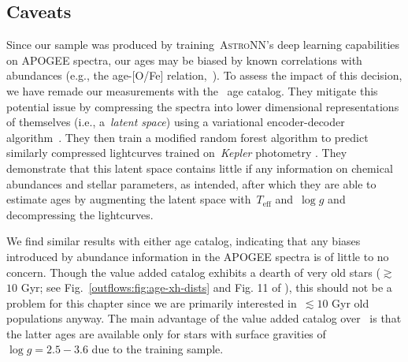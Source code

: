 \subsection{Caveats}
\label{outflows:sec:empirical:caveats}
Since our sample was produced by training~\textsc{AstroNN}'s deep learning
capabilities on APOGEE spectra, our ages may be biased by known correlations
with abundances (e.g., the age-[O/Fe] relation,~\citealt{Feuillet2019}).
To assess the impact of this decision, we have remade our measurements with
the~\citet{Leung2023} age catalog.
They mitigate this potential issue by compressing the spectra into lower
dimensional representations of themselves (i.e., a~\textit{latent space}) using
a variational encoder-decoder algorithm~\citep[e.g.,][]{LeCun2015}.
They then train a modified random forest algorithm to predict similarly
compressed lightcurves trained on~\textit{Kepler} photometry
\citep{Borucki2010}.
They demonstrate that this latent space contains little if any information on
chemical abundances and stellar parameters, as intended, after which they are
able to estimate ages by augmenting the latent space with~$T_\text{eff}$
and~$\log g$ and decompressing the lightcurves.
\par
We find similar results with either age catalog, indicating that any biases
introduced by abundance information in the APOGEE spectra is of little to no
concern.
Though the value added catalog exhibits a dearth of very old stars
($\gtrsim$$10$ Gyr; see Fig.~\ref{outflows:fig:age-xh-dists} and Fig. 11 of
\citealt{Leung2023}), this should not be a problem for this chapter since we
are primarily interested in~$\lesssim$$10$ Gyr old populations anyway.
The main advantage of the value added catalog over~\citet{Leung2023} is that
the latter ages are available only for stars with surface gravities
of~$\log g = 2.5 - 3.6$ due to the training sample.
